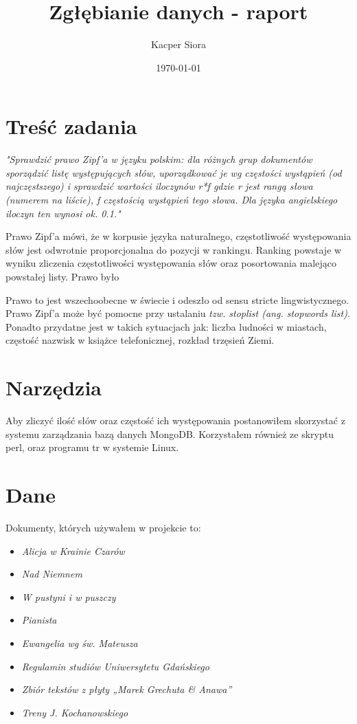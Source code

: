 \documentclass[a4paper]{article}
\title{Zgłębianie danych - raport}
\author{Kacper Siora}
\date{\today}
\begin{document}
\maketitle

\section{Treść zadania}

\hspace{1cm}\textit{"Sprawdzić prawo Zipf’a w języku polskim: dla różnych grup dokumentów sporządzić listę występujących słów, uporządkować je wg częstości wystąpień (od najczęstszego) i sprawdzić wartości iloczynów r*f gdzie r jest rangą słowa (numerem na liście), f częstością wystąpień tego słowa. Dla języka angielskiego iloczyn ten wynosi ok. 0.1."}


\hspace{1cm} Prawo Zipf'a mówi, że w korpusie języka naturalnego, częstotliwość występowania słów jest odwrotnie proporcjonalna do pozycji w rankingu. Ranking powstaje w wyniku zliczenia częstotliwości występowania słów oraz posortowania malejąco powstałej listy. Prawo było

\hspace{1cm}Prawo to jest wszechoobecne w świecie i odeszło od sensu stricte lingwistycznego. Prawo Zipf'a może być pomocne przy ustalaniu \textit{tzw. stoplist (ang. stopwords list)}. Ponadto przydatne jest w takich sytuacjach jak: liczba ludności w miastach, częstość nazwisk w książce telefonicznej, rozkład trzęsień Ziemi.


\section{Narzędzia}
\hspace{1cm}Aby zliczyć ilość słów oraz częstość ich występowania postanowiłem skorzystać z systemu zarządzania bazą danych MongoDB. Korzystałem również ze skryptu perl, oraz programu tr w systemie Linux. 
\section{Dane}
\hspace{1cm}Dokumenty, których używałem w projekcie to:
\begin{itemize}
\item \textit{Alicja w Krainie Czarów}
\item \textit{Nad Niemnem}
\item \textit{W pustyni i w puszczy}
\item \textit{Pianista}
\item \textit{Ewangelia wg św. Mateusza}
\item \textit{Regulamin studiów Uniwersytetu Gdańskiego}
\item \textit{Zbiór tekstów z płyty  „Marek Grechuta \& Anawa”}
\item \textit{Treny J. Kochanowskiego}
\end{itemize}
\end{document}
